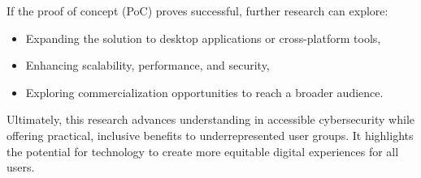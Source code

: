If the proof of concept (PoC) proves successful, further research can explore:  
\begin{itemize}
    \item Expanding the solution to desktop applications or cross-platform tools,  
    \item Enhancing scalability, performance, and security,  
    \item Exploring commercialization opportunities to reach a broader audience.  
\end{itemize}

Ultimately, this research advances understanding in accessible cybersecurity while offering practical, inclusive benefits to underrepresented user groups. It highlights the potential for technology to create more equitable digital experiences for all users.

